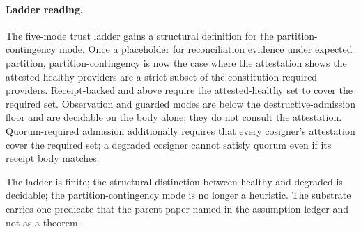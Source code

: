 \paragraph{Ladder reading.}
The five-mode trust ladder gains a structural definition for the partition-contingency mode. Once a placeholder for reconciliation evidence under expected partition, partition-contingency is now the case where the attestation shows the attested-healthy providers are a strict subset of the constitution-required providers. Receipt-backed and above require the attested-healthy set to cover the required set. Observation and guarded modes are below the destructive-admission floor and are decidable on the body alone; they do not consult the attestation. Quorum-required admission additionally requires that every cosigner's attestation cover the required set; a degraded cosigner cannot satisfy quorum even if its receipt body matches.

The ladder is finite; the structural distinction between healthy and degraded is decidable; the partition-contingency mode is no longer a heuristic. The substrate carries one predicate that the parent paper named in the assumption ledger and not as a theorem.
